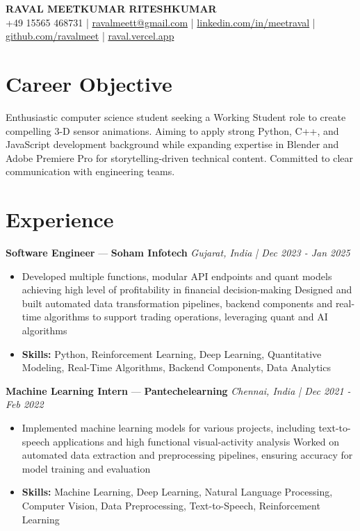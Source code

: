 \documentclass[a4paper,10pt]{article}
\begin{document}
\begin{center}
  {\Large\bfseries RAVAL MEETKUMAR RITESHKUMAR}\\[2pt]
  {\small +49 15565 468731 \;|\; \href{mailto:ravalmeett@gmail.com}{ravalmeett@gmail.com} \;|\; \href{https://www.linkedin.com/in/meetraval/}{linkedin.com/in/meetraval} \;|\; \href{https://github.com/ravalmeet}{github.com/ravalmeet} \;|\; \href{https://raval.vercel.app/}{raval.vercel.app}}
\end{center}
\vspace{-3pt}

\section*{Career Objective}
Enthusiastic computer science student seeking a Working Student role to create compelling 3-D sensor animations. Aiming to apply strong Python, C++, and JavaScript development background while expanding expertise in Blender and Adobe Premiere Pro for storytelling-driven technical content. Committed to clear communication with engineering teams.\par

\section*{Experience}
\textbf{Software Engineer} — \textbf{Soham Infotech} \hfill \textit{Gujarat, India \;|\; Dec 2023 - Jan 2025}\par
\vspace{1pt}
\begin{itemize}
  \item Developed multiple functions, modular API endpoints and quant models achieving high level of profitability in financial decision-making Designed and built automated data transformation pipelines, backend components and real-time algorithms to support trading operations, leveraging quant and AI algorithms
  \item \textbf{Skills:} Python, Reinforcement Learning, Deep Learning, Quantitative Modeling, Real-Time Algorithms, Backend Components, Data Analytics
\end{itemize}
\vspace{3pt}
\textbf{Machine Learning Intern} — \textbf{Pantechelearning} \hfill \textit{Chennai, India \;|\; Dec 2021 - Feb 2022}\par
\vspace{1pt}
\begin{itemize}
  \item Implemented machine learning models for various projects, including text-to-speech applications and high functional visual-activity analysis Worked on automated data extraction and preprocessing pipelines, ensuring accuracy for model training and evaluation
  \item \textbf{Skills:} Machine Learning, Deep Learning, Natural Language Processing, Computer Vision, Data Preprocessing, Text-to-Speech, Reinforcement Learning
\end{itemize}
\end{document}
